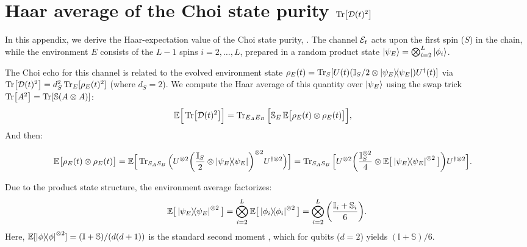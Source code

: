 \appendix
\section{Haar average of the Choi state purity $\Tr[\mathcal{D}(t)^2]$}
\label{app:haar}
In this appendix, we derive the Haar-expectation value of the
Choi state purity, . The channel $\mathcal{E}_t$
acts upon the first spin ($S$) in the chain,
while the environment $E$ consists of the $L-1$ spins
$i=2, \dots, L$, prepared in a random product state
$\ket{\psi_E} = \bigotimes_{i=2}^L \ket{\phi_i}$.

The Choi echo for this channel is related to the evolved
environment state $\rho_E(t) = \Tr_S[U(t) (\mathbb{I}_S/2 \otimes
\dyad{\psi_E}) U^\dagger(t)]$ via
$\Tr[\mathcal{D}(t)^2] = d_S^2 \Tr_E[\rho_E(t)^2]$
(where $d_S=2$).
We compute the Haar average of this quantity over $\ket{\psi_E}$
using the swap trick $\Tr[A^2] = \Tr[\mathbb{S} (A \otimes A)]$:
\begin{align}
\mathbb{E}\Big[\Tr[\mathcal{D}(t)^2]\Big]
&= \Tr_{E_A E_B} \Big[
\mathbb{S}_E \, \mathbb{E}\big[ \rho_E(t) \otimes \rho_E(t) \big] \Big],
\label{eq:app:avg_swap}
\end{align}
And then:
\begin{widetext}
\begin{align}
\mathbb{E}\big[ \rho_E(t) \otimes \rho_E(t) \big]
&= \mathbb{E}\Big[
\Tr_{S_A S_B} \Big(
U^{\otimes 2}
\qty( \frac{\mathbb{I}_S}{2} \otimes \dyad{\psi_E} )^{\otimes 2}
U^{\dagger \otimes 2}
\Big) \Big]
%
= \Tr_{S_A S_B} \Big[
U^{\otimes 2}
\qty( \frac{\mathbb{I}_S^{\otimes 2}}{4} \otimes
\mathbb{E}\big[\dyad{\psi_E}^{\otimes 2}\big] )
U^{\dagger \otimes 2}
\Big].
\label{eq:app:avg_rhoE_tensor}
\end{align}
\end{widetext}
Due to the product state structure, the environment average
factorizes:
\begin{equation}
\mathbb{E}\big[\dyad{\psi_E}^{\otimes 2}\big]
= \bigotimes_{i=2}^L
\mathbb{E}\big[\dyad{\phi_i}^{\otimes 2}\big]
= \bigotimes_{i=2}^L \qty( \frac{\mathbb{I}_i + \mathbb{S}_i}{6} ).
\label{eq:app:haar_moment_2_qubit}
\end{equation}
Here, $\mathbb{E}[\dyad{\phi}^{\otimes 2}] = (\mathbb{I} + \mathbb{S})/(d(d+1))$
is the standard second moment \cite{collins_2022_weingarten},
which for qubits ($d=2$) yields
$(\mathbb{I} + \mathbb{S})/6$.

